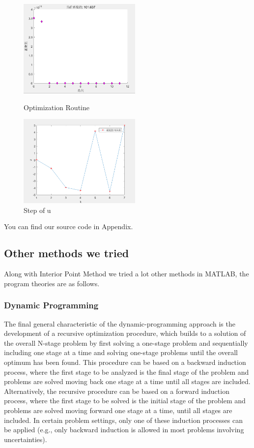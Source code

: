 \documentclass{mcmthesis}
\begin{document}
\begin{figure}[H]
\centering
\begin{minipage}[t]{0.48\textwidth}
\centering
\includegraphics[width=6cm]{Optimal Control of a Linear Discrete System/MCM20200128/picture/第二问.png}
\caption{Optimization Routine}
\end{minipage}
\begin{minipage}[t]{0.48\textwidth}
\centering
\includegraphics[width=6cm]{Optimal Control of a Linear Discrete System/MCM20200128/picture/第二问2.png}
\caption{Step of u}
\end{minipage}
\end{figure}

You can find our source code in Appendix. 

\subsection{Other methods we tried}

Along with Interior Point Method we tried a lot other methods in MATLAB, the program theories are as follows.

\subsubsection{Dynamic Programming}
The final general characteristic of the dynamic-programming approach is the development of a recursive optimization procedure, which builds to a solution of the overall N-stage problem by first solving a one-stage problem and sequentially including one stage at a time and solving one-stage problems until the overall optimum has been found. This procedure can be based on a backward induction process, where the first stage to be analyzed is the final stage of the problem and problems are solved moving back one stage at a time until all stages are included. Alternatively, the recursive procedure can be based on a forward induction process, where the first stage to be solved is the initial stage of the problem and problems are solved moving forward
one stage at a time, until all stages are included. In certain problem settings, only one of these induction processes can be applied (e.g., only backward induction is allowed in most problems involving uncertainties).
\end{document}
